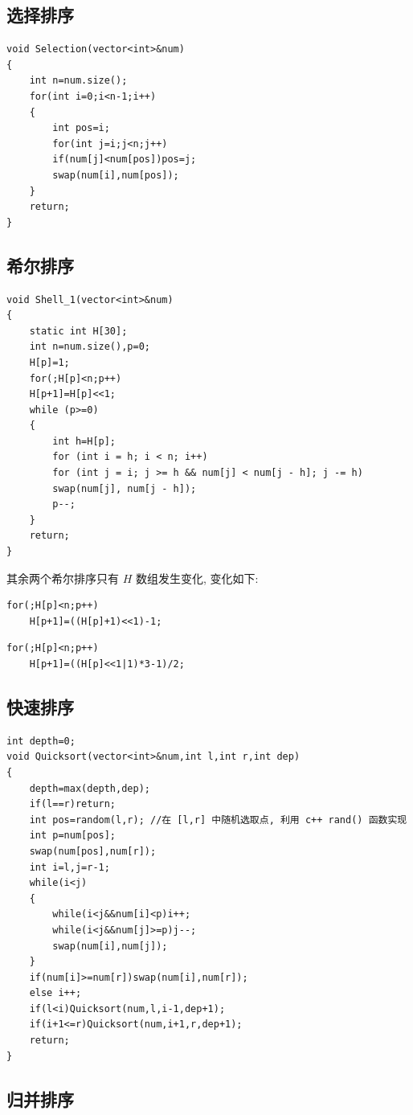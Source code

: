 \subsection{选择排序}

\begin{lstlisting}
void Selection(vector<int>&num)
{
	int n=num.size();
	for(int i=0;i<n-1;i++)
	{
		int pos=i;
		for(int j=i;j<n;j++)
		if(num[j]<num[pos])pos=j;
		swap(num[i],num[pos]);
	}
	return;
}
\end{lstlisting}

\subsection{希尔排序}

\begin{lstlisting}
void Shell_1(vector<int>&num)
{
	static int H[30];
	int n=num.size(),p=0;
	H[p]=1;
	for(;H[p]<n;p++)
	H[p+1]=H[p]<<1;
	while (p>=0)
	{
		int h=H[p];
		for (int i = h; i < n; i++)
		for (int j = i; j >= h && num[j] < num[j - h]; j -= h)
		swap(num[j], num[j - h]);
		p--;
	}
	return;
}
\end{lstlisting}

其余两个希尔排序只有 $H$ 数组发生变化, 变化如下:

\begin{lstlisting}
for(;H[p]<n;p++)
	H[p+1]=((H[p]+1)<<1)-1;
\end{lstlisting}

\begin{lstlisting}
for(;H[p]<n;p++)
	H[p+1]=((H[p]<<1|1)*3-1)/2;
\end{lstlisting}

\subsection{快速排序}

\begin{lstlisting}
int depth=0;
void Quicksort(vector<int>&num,int l,int r,int dep)
{
	depth=max(depth,dep);
	if(l==r)return;
	int pos=random(l,r); //在 [l,r] 中随机选取点, 利用 c++ rand() 函数实现
	int p=num[pos];
	swap(num[pos],num[r]);
	int i=l,j=r-1;
	while(i<j)
	{
		while(i<j&&num[i]<p)i++;
		while(i<j&&num[j]>=p)j--;
		swap(num[i],num[j]);
	}
	if(num[i]>=num[r])swap(num[i],num[r]);
	else i++;
	if(l<i)Quicksort(num,l,i-1,dep+1);
	if(i+1<=r)Quicksort(num,i+1,r,dep+1);
	return;
}
\end{lstlisting}

\subsection{归并排序}


